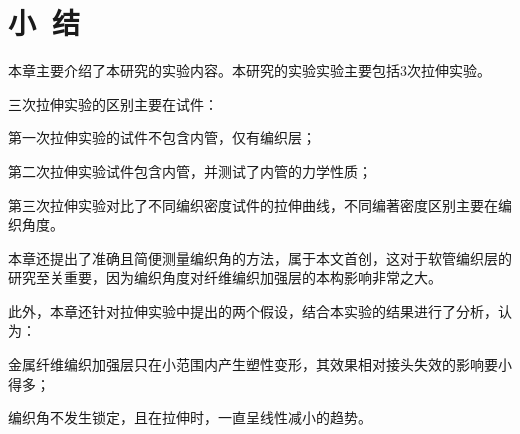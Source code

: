\section{小~结}
本章主要介绍了本研究的实验内容。本研究的实验实验主要包括3次拉伸实验。

三次拉伸实验的区别主要在试件：
\begin{compactitem}
	\item 第一次拉伸实验的试件不包含内管，仅有编织层；
	\item 第二次拉伸实验试件包含内管，并测试了内管的力学性质；
	\item 第三次拉伸实验对比了不同编织密度试件的拉伸曲线，不同编著密度区别主要在编织角度。
\end{compactitem}

本章还提出了准确且简便测量编织角的方法，属于本文首创，这对于软管编织层的研究至关重要，因为编织角度对纤维编织加强层的本构影响非常之大。

此外，本章还针对\ha 拉伸实验中提出的两个假设，结合本实验的结果进行了分析，认为：
\begin{compactitem}
	\item 金属纤维编织加强层只在小范围内产生塑性变形，其效果相对接头失效的影响要小得多；
	\item 编织角不发生锁定，且在拉伸时，一直呈线性减小的趋势。
\end{compactitem}